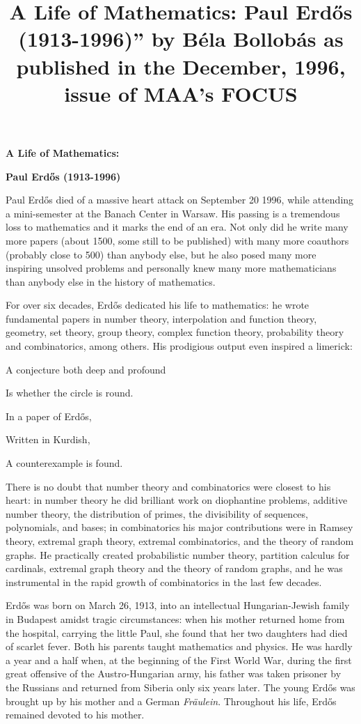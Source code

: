 \documentclass[a6paper]{article}
\title{A Life of Mathematics: Paul Erd\H{o}s (1913-1996)'' by B\'ela Bollob\'as as published in the December, 1996, issue of MAA's FOCUS}
\begin{document}
\vglue 1cm
\centerline
{\bf A Life of Mathematics:}

\centerline
{\bf Paul Erd\H{o}s (1913-1996)}

\bigskip
Paul Erd\H{o}s died of a massive heart attack on September 20 1996, 
while attending a mini-semester at the Banach Center in Warsaw. His
passing is a tremendous loss to mathematics and it marks the end of an era.
Not only did he write many more papers (about 1500, some still to be 
published) with many more coauthors (probably close to 500) than 
anybody else, but he also posed many more inspiring unsolved  problems  
and personally knew many more mathematicians than 
anybody else in the history of mathematics. 


For over six decades, Erd\H{o}s dedicated his life to mathematics: he 
wrote fundamental papers in number theory, interpolation and function 
theory, geometry, set theory, group theory, complex function theory, 
probability theory and combinatorics, among others. His prodigious output 
even inspired a limerick:

{\hskip1.5cm A conjecture both deep and profound}


{\hskip 1.5cm Is whether the circle is round. }


{\hskip2cm In a paper of Erd\H{o}s,}

{\hskip 2cm Written in Kurdish,}

{\hskip 1.5cm A counterexample is found.} 


\noindent
There is no doubt that number theory and combinatorics were closest to his 
heart: in number theory he did brilliant work on diophantine problems,
additive number theory, the distribution of primes, the divisibility of
sequences, polynomials, and bases;  in combinatorics his major 
contributions were in Ramsey theory, extremal graph theory, extremal 
combinatorics, and the theory of random graphs. He practically created 
probabilistic number theory, 
partition calculus for cardinals,
extremal graph theory and the theory of random graphs,
and he was instrumental in the rapid growth of combinatorics in the
last few decades.




Erd\H{o}s was born on March 26, 1913, 
into an intellectual Hungarian-Jewish family in Budapest
amidst tragic circumstances:  when his mother returned home from 
the hospital, carrying the little Paul, she found that her two daughters 
had died of scarlet fever.  
Both his parents taught mathematics and physics. 
He was hardly a year and a half when, at the beginning of the First World War,
during the first great 
offensive of the Austro-Hungarian army,
his father was taken prisoner by the Russians and
returned from Siberia only six years later.
The young Erd\H{o}s was brought up by
his mother and a German {\it Fr\"aulein}. Throughout his life, 
Erd\H{o}s remained devoted to his mother.
\end{document}

